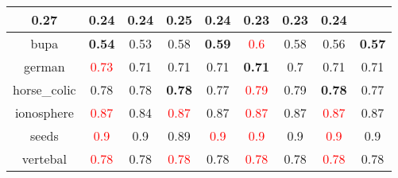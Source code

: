\documentclass{article}%
\begin{document}
\begin{tabular}{c|cccccccc}
{0.27
}&0.24&0.24&\textbf{0.25}&\textbf{0.24}&0.23&0.23&\textbf{0.24}\\%
\hline%
bupa&\textbf{0.54}&0.53&0.58&\textbf{0.59}&\textcolor{red}{ 
0.6
}&0.58&0.56&\textbf{0.57}\\%
\hline%
german&\textcolor{red}{ 
0.73
}&0.71&0.71&0.71&\textbf{0.71}&0.7&0.71&0.71\\%
\hline%
horse\_colic&0.78&0.78&\textbf{0.78}&0.77&\textcolor{red}{ 
0.79
}&0.79&\textbf{0.78}&0.77\\%
\hline%
ionosphere&\textcolor{red}{ 
0.87
}&0.84&\textcolor{red}{ 
0.87
}&0.87&\textcolor{red}{ 
0.87
}&0.87&\textcolor{red}{ 
0.87
}&0.87\\%
\hline%
seeds&\textcolor{red}{ 
0.9
}&0.9&0.89&\textcolor{red}{ 
0.9
}&\textcolor{red}{ 
0.9
}&0.9&\textcolor{red}{ 
0.9
}&0.9\\%
\hline%
vertebal&\textcolor{red}{ 
0.78
}&0.78&\textcolor{red}{ 
0.78
}&0.78&\textcolor{red}{ 
0.78
}&0.78&\textcolor{red}{ 
0.78
}&0.78\\%
\hline%
\end{tabular}

%
\end{document}
